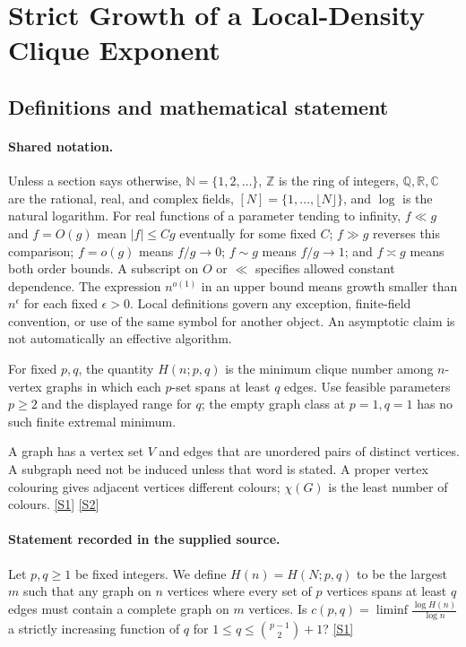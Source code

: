 \documentclass[11pt,a4paper]{article}
\newcommand{\N}{\mathbb{N}}
\newcommand{\Z}{\mathbb{Z}}
\newcommand{\Q}{\mathbb{Q}}
\newcommand{\R}{\mathbb{R}}
\newcommand{\C}{\mathbb{C}}
\newcommand{\sref}[2]{\hyperlink{source:#1:#2}{[S#2]}}
\begin{document}
\section{Strict Growth of a Local-Density Clique Exponent}\label{statement}


\subsection{Definitions and mathematical statement}

\paragraph{Shared notation.}Unless a section says otherwise, $\N=\{1,2,\ldots\}$,
$\Z$ is the ring of integers, $\Q,\R,\C$ are the rational, real, and complex
fields, $[N]=\{1,\ldots,\lfloor N\rfloor\}$, and $\log$ is the natural
logarithm. For real functions of a parameter tending to infinity,
$f\ll g$ and $f=O(g)$ mean $|f|\leq Cg$ eventually for some fixed $C$;
$f\gg g$ reverses this comparison; $f=o(g)$ means $f/g\to0$;
$f\sim g$ means $f/g\to1$; and $f\asymp g$ means both order bounds.
A subscript on $O$ or $\ll$ specifies allowed constant dependence.
The expression $n^{o(1)}$ in an upper bound means growth smaller than
$n^\epsilon$ for each fixed $\epsilon>0$. Local definitions govern any
exception, finite-field convention, or use of the same symbol for another
object. An asymptotic claim is not automatically an effective algorithm.



For fixed $p,q$, the quantity $H(n;p,q)$ is the minimum clique number among $n$-vertex graphs in which each $p$-set spans at least $q$ edges. Use feasible parameters $p\geq2$ and the displayed range for $q$; the empty graph class at $p=1,q=1$ has no such finite extremal minimum.

A graph has a vertex set $V$ and edges that are unordered pairs of distinct vertices. A subgraph need not be induced unless that word is stated. A proper vertex colouring gives adjacent vertices different colours; $\chi(G)$ is the least number of colours. \sref{statement}{1} \sref{statement}{2}

\paragraph{Statement recorded in the supplied source.}
Let $p,q\geq 1$ be fixed integers. We define $H(n)=H(N;p,q)$ to be the largest $m$ such that any graph on $n$ vertices where every set of $p$ vertices spans at least $q$ edges must contain a complete graph on $m$ vertices.
Is $ c(p,q)=\liminf \frac{\log H(n)}{\log n} $ a strictly increasing function of $q$ for $1\leq q\leq \binom{p-1}{2}+1$? \sref{statement}{1}
\end{document}
